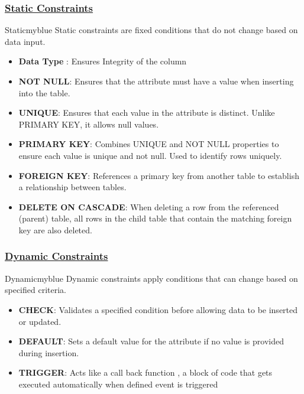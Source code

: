 \subsubsection{\underline{Static Constraints}}
\begin{prettyBox}{Static}{myblue}
Static constraints are fixed conditions that do not change based on data input.
\begin{itemize} 
\item \textbf{Data Type} : Ensures Integrity of the column
\item \textbf{NOT NULL}: Ensures that the attribute must have a value when inserting into the table.
\item \textbf{UNIQUE}: Ensures that each value in the attribute is distinct. Unlike PRIMARY KEY, it allows null values.
\item \textbf{PRIMARY KEY}: Combines UNIQUE and NOT NULL properties to ensure each value is unique and not null.
Used to identify rows uniquely. 
\item \textbf{FOREIGN KEY}: References a primary key from another table to establish a relationship between tables.
\item \textbf{DELETE ON CASCADE}: When deleting a row from the referenced (parent) table, all rows in the child table 
that contain the matching foreign key are also deleted.
\end{itemize}
\end{prettyBox}

\subsubsection{\underline{Dynamic Constraints}}

\begin{prettyBox}{Dynamic}{myblue}
Dynamic constraints apply conditions that can change based on specified criteria.
\begin{itemize} 
\item \textbf{CHECK}: Validates a specified condition before allowing data to be inserted or updated. 
\item \textbf{DEFAULT}: Sets a default value for the attribute if no value is provided during insertion. 
\item \textbf{TRIGGER}: Acts like a call back function , a block of code that gets executed automatically when 
defined event is triggered
\end{itemize}
\end{prettyBox}

